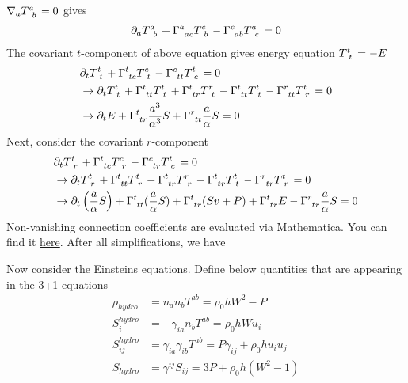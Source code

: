 \documentclass[prd]{revtex4}
\newcommand*\apost{\textsc{\char13}}
\begin{document}
$\nabla_a T\indices{^a_b}=0$ gives
\begin{align}
\partial_a T\indices{^a_b} + \Gamma\indices{^a_{ac}}T\indices{^c_b} - \Gamma\indices{^c_{ab}}T\indices{^a_c} = 0
\end{align}
The covariant $t$-component of above equation gives energy equation $T\indices{^t_t} = - E$
\begin{align}
&\partial_t T\indices{^t_t} + \Gamma\indices{^t_{tc}}T\indices{^c_t} - \Gamma\indices{^c_{tt}}T\indices{^t_c} = 0 \nonumber \\
&\rightarrow \partial_t T\indices{^t_t} + \Gamma\indices{^t_{tt}}T\indices{^t_t} +\Gamma\indices{^t_{tr}}T\indices{^r_t}- \Gamma\indices{^t_{tt}}T\indices{^t_t} - \Gamma\indices{^r_{tt}}T\indices{^t_r} = 0 \nonumber \\
&\rightarrow \partial_t E + \Gamma\indices{^t_{tr}} \frac{a^3}{\alpha^3} S + \Gamma\indices{^r_{tt}} \frac{a}{\alpha} S = 0
\end{align}
Next, consider the covariant $r$-component 
\begin{align}
&\partial_t T\indices{^t_r} + \Gamma\indices{^t_{tc}}T\indices{^c_r} - \Gamma\indices{^c_{tr}}T\indices{^t_c} = 0 \nonumber \\
&\rightarrow \partial_t T\indices{^t_r} + \Gamma\indices{^t_{tt}}T\indices{^t_r} +\Gamma\indices{^t_{tr}}T\indices{^r_r}- \Gamma\indices{^t_{tr}}T\indices{^t_t} - \Gamma\indices{^r_{tr}}T\indices{^t_r} = 0 \nonumber \\
&\rightarrow \partial_t \left(\frac{a}{\alpha} S\right) + \Gamma\indices{^t_{tt}}(\frac{a}{\alpha} S)  +\Gamma\indices{^t_{tr}}(Sv+P) + \Gamma\indices{^t_{tr}}E - \Gamma\indices{^r_{tr}}\frac{a}{\alpha} S= 0 \nonumber 
\end{align}
Non-vanishing connection coefficients are evaluated via Mathematica. You can find it \href{https://github.com/hlim88/PBH-NS/tree/master/tools}{here}. After all simplifications, we have
\fi


Now consider the Einstein\apost s equations. Define below quantities that are appearing in the 3+1 equations
\begin{align}
\rho_{hydro} &= n_a n_b T^{ab} = \rho_0 h W^2 - P \\
S_i^{hydro} &= - \gamma_{ia} n_b T^{ab}  = \rho_0 h W u_i \\
S_{ij}^{hydro} &= \gamma_{ia} \gamma_{ib} T^{ab} = P \gamma_{ij} + \rho_0 h u_i u_j \\
S_{hydro} &= \gamma^{ij} S_{ij} = 3 P + \rho_0 h (W^2 -1)
\end{align}
\end{document}
